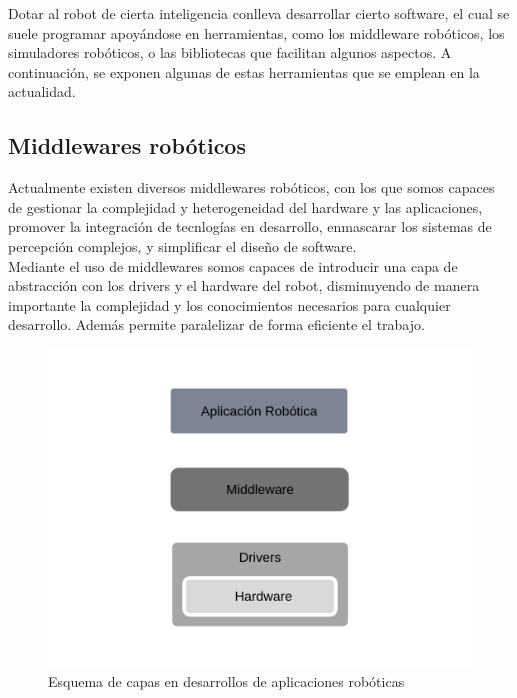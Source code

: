 Dotar al robot de cierta inteligencia conlleva desarrollar cierto software, el cual se suele programar apoyándose en herramientas, como los middleware robóticos, los simuladores robóticos, o las  bibliotecas que facilitan algunos aspectos. A continuación, se exponen algunas de estas herramientas que se emplean en la actualidad.\\

\subsection{Middlewares robóticos}

Actualmente existen diversos middlewares robóticos, con los que somos capaces de gestionar la complejidad y heterogeneidad del hardware y las aplicaciones, promover la integración de tecnlogías en desarrollo, enmascarar los sistemas de percepción complejos, y simplificar el diseño de software.\\

Mediante el uso de middlewares somos capaces de introducir una capa de abstracción con los drivers y el hardware del robot, disminuyendo de manera importante la complejidad y los conocimientos necesarios para cualquier desarrollo. Además permite paralelizar de forma eficiente el trabajo.\\

\begin{figure}[H]
    	\centering
     	\includegraphics[scale=0.40]{img/middleware.png}
  		\caption{Esquema de capas en desarrollos de aplicaciones robóticas}
  		\label{fig:middleware}
\end{figure}

